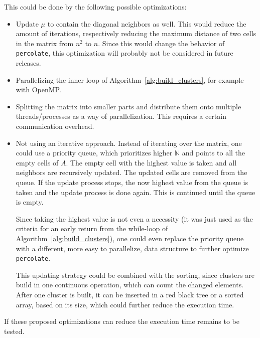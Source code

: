 \documentclass[twoside,11pt]{article}
\def\perc{\texttt{perco\-late}}
\begin{document}
This could be done by the following possible optimizations:
\begin{itemize}
  \item Update $\mu$ to contain the diagonal neighbors as
        well. This would reduce the amount of iterations,
        respectively reducing the maximum distance of two
        cells in the matrix from $n^2$ to $n$.
        Since this would change the behavior of \perc{},
        this optimization will probably not be considered
        in future releases.

  \item Parallelizing the inner loop of
        Algorithm~\ref{alg:build_clusters}, for example
        with OpenMP.

  \item Splitting the matrix into smaller parts and
        distribute them onto multiple threads/processes
        as a way of parallelization. This requires a
        certain communication overhead.

  \item Not using an iterative approach. Instead of
        iterating over the matrix, one could use a priority
        queue, which prioritizes higher $\mathbb{N}$
        and points to all the empty cells of $A$.
        The empty cell with the highest value is taken and
        all neighbors are recursively updated.
        The updated cells are removed from the queue.
        If the update process stops, the now highest value
        from the queue is taken and the update
        process is done again.
        This is continued until the queue is empty.

        Since taking the highest value is not even a
        necessity (it was just used as the criteria for
        an early return from the while-loop of
        Algorithm~\ref{alg:build_clusters}), one could
        even replace the priority queue with a different,
        more easy to parallelize, data structure to further
        optimize \perc.

        This updating strategy could be combined with the
        sorting, since clusters are build in one continuous
        operation, which can count the changed elements.
        After one cluster is built, it can be inserted in
        a red black tree or a sorted array, based on its
        size, which could further reduce the execution
        time.

\end{itemize}
If these proposed optimizations can reduce the execution
time remains to be tested.
\end{document}
